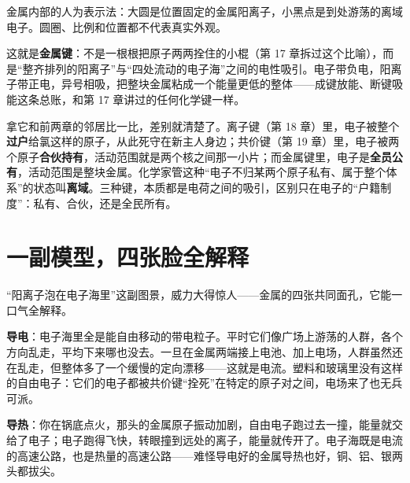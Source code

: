 \begin{center}

\footnotesize 金属内部的人为表示法：大圆是位置固定的金属阳离子，小黑点是到处游荡的离域电子。圆圈、比例和位置都不代表真实外观。
\end{center}

这就是\textbf{金属键}：不是一根根把原子两两拴住的小棍（第 17 章拆过这个比喻），而是“整齐排列的阳离子”与“四处流动的电子海”之间的电性吸引。电子带负电，阳离子带正电，异号相吸，把整块金属粘成一个能量更低的整体——成键放能、断键吸能这条总账，和第 17 章讲过的任何化学键一样。

拿它和前两章的邻居比一比，差别就清楚了。离子键（第 18 章）里，电子被整个\textbf{过户}给氯这样的原子，从此死守在新主人身边；共价键（第 19 章）里，电子被两个原子\textbf{合伙持有}，活动范围就是两个核之间那一小片；而金属键里，电子是\textbf{全员公有}，活动范围是整块金属。化学家管这种“电子不归某两个原子私有、属于整个体系”的状态叫\textbf{离域}。三种键，本质都是电荷之间的吸引，区别只在电子的“户籍制度”：私有、合伙，还是全民所有。

\section{一副模型，四张脸全解释}

“阳离子泡在电子海里”这副图景，威力大得惊人——金属的四张共同面孔，它能一口气全解释。

\textbf{导电}：电子海里全是能自由移动的带电粒子。平时它们像广场上游荡的人群，各个方向乱走，平均下来哪也没去。一旦在金属两端接上电池、加上电场，人群虽然还在乱走，但整体多了一个缓慢的定向漂移——这就是电流。塑料和玻璃里没有这样的自由电子：它们的电子都被共价键“拴死”在特定的原子对之间，电场来了也无兵可派。

\textbf{导热}：你在锅底点火，那头的金属原子振动加剧，自由电子跑过去一撞，能量就交给了电子；电子跑得飞快，转眼撞到远处的离子，能量就传开了。电子海既是电流的高速公路，也是热量的高速公路——难怪导电好的金属导热也好，铜、铝、银两头都拔尖。

